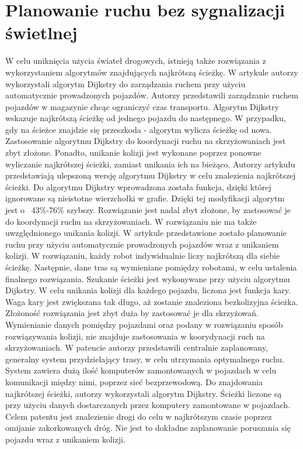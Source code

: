 \section{Planowanie ruchu bez sygnalizacji świetlnej}

W celu uniknięcia użycia świateł drogowych, istnieją także rozwiązania z wykorzystaniem algorytmów znajdujących najkrótszą ścieżkę. W artykule \cite{shaikh2013agv} autorzy wykorzystali algorytm Dijkstry do zarządzania ruchem przy użyciu automatycznie prowadzonych pojazdów. Autorzy przedstawili zarządzanie ruchem pojazdów w magazynie chcąc ograniczyć czas transportu. Algorytm Dijkstry wskazuje najkrótszą ścieżkę od jednego pojazdu do następnego. W przypadku, gdy na ścieżce znajdzie się przeszkoda - algorytm wylicza ścieżkę od nowa. Zastosowanie algorytmu Dijkstry do koordynacji ruchu na skrzyżowaniach jest zbyt złożone. Ponadto, unikanie kolizji jest wykonane poprzez ponowne wyliczanie najkrótszej ścieżki, zamiast unikania ich na bieżąco.
\newline
\indent
Autorzy artykułu \cite{huang2013improved} przedstawiają ulepszoną wersję algorytmu Dijkstry w celu znalezienia najkrótszej ścieżki. Do algorytmu Dijkstry wprowadzona została funkcja, dzięki której ignorowane są nieistotne wierzchołki w grafie. Dzięki tej modyfikacji algorytm jest o ~43\%-76\% szybszy. Rozwiązanie jest nadal zbyt złożone, by zastosować je do koordynacji ruchu na skrzyżowaniach. W rozwiązaniu nie ma także uwzględnionego unikania kolizji.
\newline
\indent
W artykule \cite{ando2003autonomous} przedstawione zostało planowanie ruchu przy użyciu automatycznie prowadzonych pojazdów wraz z unikaniem kolizji. W rozwiązaniu, każdy robot indywidualnie liczy najkrótszą dla siebie ścieżkę. Następnie, dane tras są wymieniane pomiędzy robotami, w celu ustalenia finalnego rozwiązania. Szukanie ścieżki jest wykonywane przy użyciu algorytmu Dijkstry. W celu unikania kolizji dla każdego pojazdu, liczona jest funkcja kary. Waga kary jest zwiększana tak długo, aż zostanie znaleziona bezkolizyjna ścieżka. Złożoność rozwiązania jest zbyt duża by zastosować je dla skrzyżowań. Wymienianie danych pomiędzy pojazdami oraz podany w rozwiązaniu sposób rozwiązywania kolizji, nie znajduje zastosowania w koorydynacji ruch na skrzyżowaniach.
\newline
\indent
W patencie \cite{gazis1997optimal} autorzy przedstawili centralnie zaplanowany, generalny system przydzielający trasy, w celu utrzymania optymalnego ruchu. System zawiera dużą ilość komputerów zamontowanych w pojazdach w celu komunikacji między nimi, poprzez sieć bezprzewodową. Do znajdowania najkrótszej ścieżki, autorzy wykorzystali algorytm Dijkstry. Ścieżki liczone są przy użyciu danych dostarczanych przez komputery zamontowane w pojazdach. Celem patentu jest znalezienie drogi do celu w najkrótszym czasie poprzez omijanie zakorkowanych dróg. Nie jest to dokładne zaplanowanie poruszania się pojazdu wraz z unikaniem kolizji.
